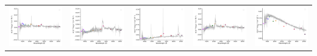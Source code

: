 \begin{center}
\begin{longtable}{l l l l l }
    \includegraphics[width=0.19\linewidth, clip]{Figs/Figs-sdss/spec-4217-55478-0796-STRIPE82-0004-029068.pdf} & \includegraphics[width=0.19\linewidth, clip]{Figs/Figs-sdss/spec-4219-55480-0333-STRIPE82-0009-033328.pdf} & \includegraphics[width=0.19\linewidth, clip]{Figs/Figs-sdss/spec-4234-55478-0651-STRIPE82-0044-019857.pdf} & \includegraphics[width=0.19\linewidth, clip]{Figs/Figs-sdss/spec-4236-55479-0206-STRIPE82-0049-010030.pdf} & \includegraphics[width=0.19\linewidth, clip]{Figs/Figs-sdss/spec-4237-55478-0412-STRIPE82-0049-025567.pdf} \\

\end{longtable}
\end{center}
